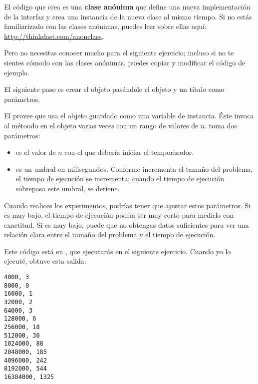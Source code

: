 \documentclass[12pt]{book}
\theoremstyle{exercise}
\begin{document}

El código que crea  es una {\bf clase anónima} que
define una nueva implementación de la interfaz  y
crea una instancia de la nueva clase al mismo tiempo. Si no estás
familiarizado con las clases anónimas, puedes leer sobre ellas aquí:
\url{http://thinkdast.com/anonclass}.

Pero no necesitas conocer mucho para el siguiente ejercicio; incluso si
no te sientes cómodo con las clases anónimas, puedes copiar
y modificar el código de ejemplo.

El siguiente paso es crear el objeto  pasándole el
objeto  y un título como parámetros.

El  provee  que usa el objeto
 guardado como una variable de instancia. Éste invoca al
métoodo  en el objeto  varias veces
con un rango de valores de $n$.  toma dos
parámetros:

\begin{itemize}

\item
   es el valor de $n$ con el que debería iniciar el
  temporizador.

\item
   es un umbral en milisegundos. Conforme
   incrementa el tamaño del problema, el tiempo de ejecución se incrementa;
  cuando el tiempo de ejecución sobrepasa este umbral,  se detiene.

\end{itemize}

Cuando realices los experimentos, podrías tener que ajustar estos
parámetros. Si  es muy bajo, el tiempo de ejecución podría
ser muy corto para medirlo con exactitud. Si  es muy bajo, puede
que no obtengas datos suficientes para ver una relación clara entre el tamaño del
problema y el tiempo de ejecución.

Este código está en , que ejecutarás en el siguiente
ejercicio. Cuando yo lo ejecuté, obtuve esta salida:

\begin{verbatim}
4000, 3
8000, 0
16000, 1
32000, 2
64000, 3
128000, 6
256000, 18
512000, 30
1024000, 88
2048000, 185
4096000, 242
8192000, 544
16384000, 1325
\end{verbatim}
\end{document}
